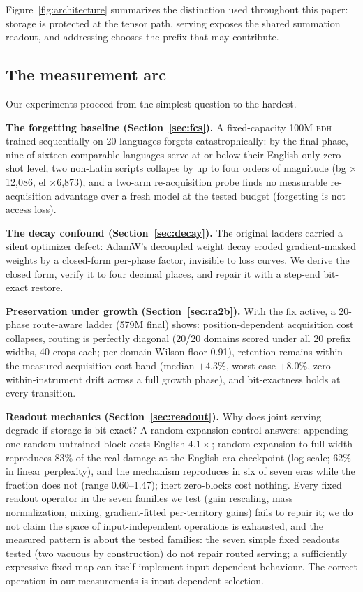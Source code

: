 \documentclass[11pt]{article}
\theoremstyle{definition}\newtheorem{definition}{Definition}
\theoremstyle{remark}\newtheorem{remark}{Remark}
\newcommand{\BDH}{\textsc{bdh}}
\begin{document}
Figure~\ref{fig:architecture} summarizes the distinction used throughout this paper: storage is protected at the tensor path, serving exposes the shared summation readout, and addressing chooses the prefix that may contribute.

\subsection{The measurement arc}

Our experiments proceed from the simplest question to the hardest.

\textbf{The forgetting baseline (Section~\ref{sec:fcs}).} A fixed-capacity 100M \BDH{} trained sequentially on 20 languages forgets catastrophically: by the final phase, nine of sixteen comparable languages serve at or below their English-only zero-shot level, two non-Latin scripts collapse by up to four orders of magnitude (bg $\times$12{,}086, el $\times$6{,}873), and a two-arm re-acquisition probe finds no measurable re-acquisition advantage over a fresh model at the tested budget (forgetting is not access loss).

\textbf{The decay confound (Section~\ref{sec:decay}).} The original ladders carried a silent optimizer defect: AdamW's decoupled weight decay eroded gradient-masked weights by a closed-form per-phase factor, invisible to loss curves. We derive the closed form, verify it to four decimal places, and repair it with a step-end bit-exact restore.

\textbf{Preservation under growth (Section~\ref{sec:ra2b}).} With the fix active, a 20-phase route-aware ladder (579M final) shows: position-dependent acquisition cost collapses, routing is perfectly diagonal (20/20 domains scored under all 20 prefix widths, 40 crops each; per-domain Wilson floor 0.91), retention remains within the measured acquisition-cost band (median $+4.3\%$, worst case $+8.0\%$, zero within-instrument drift across a full growth phase), and bit-exactness holds at every transition.

\textbf{Readout mechanics (Section~\ref{sec:readout}).} Why does joint serving degrade if storage is bit-exact? A random-expansion control answers: appending one random untrained block costs English $4.1\times$; random expansion to full width reproduces 83\% of the real damage at the English-era checkpoint (log scale; 62\% in linear perplexity), and the mechanism reproduces in six of seven eras while the fraction does not (range 0.60--1.47); inert zero-blocks cost nothing. Every fixed readout operator in the seven families we test (gain rescaling, mass normalization, mixing, gradient-fitted per-territory gains) fails to repair it; we do not claim the space of input-independent operations is exhausted, and the measured pattern is about the tested families: the seven simple fixed readouts tested (two vacuous by construction) do not repair routed serving; a sufficiently expressive fixed map can itself implement input-dependent behaviour. The correct operation in our measurements is input-dependent selection.
\end{document}
